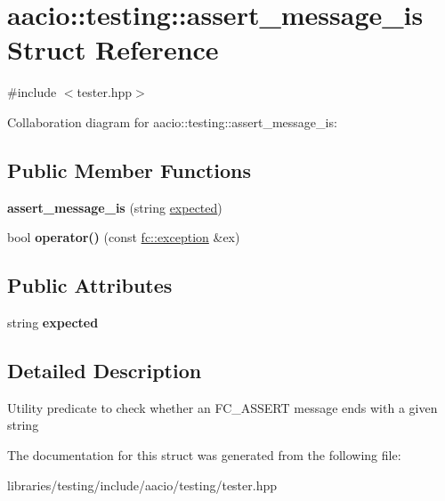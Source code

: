 \hypertarget{structaacio_1_1testing_1_1assert__message__is}{}\section{aacio\+:\+:testing\+:\+:assert\+\_\+message\+\_\+is Struct Reference}
\label{structaacio_1_1testing_1_1assert__message__is}


{\ttfamily \#include $<$tester.\+hpp$>$}



Collaboration diagram for aacio\+:\+:testing\+:\+:assert\+\_\+message\+\_\+is\+:
\subsection*{Public Member Functions}
\begin{DoxyCompactItemize}
\item 
\mbox{\label{structaacio_1_1testing_1_1assert__message__is_afa1f118dbe3db483df6d3210fbc971ef}} 
{\bfseries assert\+\_\+message\+\_\+is} (string \mbox{\hyperlink{structexpected}{expected}})
\item 
\mbox{\label{structaacio_1_1testing_1_1assert__message__is_a05c6dcf7ba216fecd2966db9fb8ed47c}} 
bool {\bfseries operator()} (const \mbox{\hyperlink{classfc_1_1exception}{fc\+::exception}} \&ex)
\end{DoxyCompactItemize}
\subsection*{Public Attributes}
\begin{DoxyCompactItemize}
\item 
\mbox{\label{structaacio_1_1testing_1_1assert__message__is_aa93240a088dde3289cd3449e6747f786}} 
string {\bfseries expected}
\end{DoxyCompactItemize}


\subsection{Detailed Description}
Utility predicate to check whether an F\+C\+\_\+\+A\+S\+S\+E\+RT message ends with a given string 

The documentation for this struct was generated from the following file\+:\begin{DoxyCompactItemize}
\item 
libraries/testing/include/aacio/testing/tester.\+hpp\end{DoxyCompactItemize}
